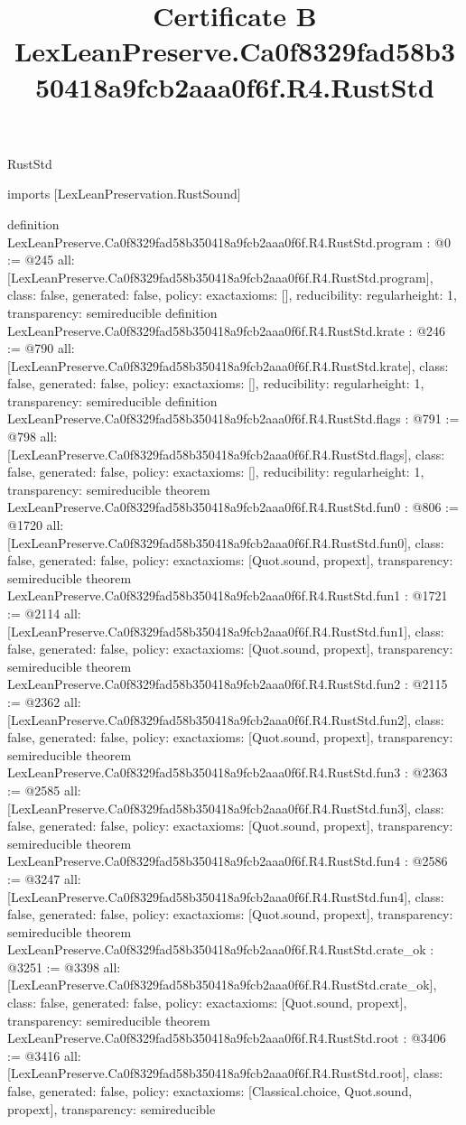 \begin{lexlean}{RustStd}
\title{Certificate B LexLeanPreserve.Ca0f8329fad58b350418a9fcb2aaa0f6f.R4.RustStd}
\begin{coremodule}
imports [LexLeanPreservation.RustSound]

definition LexLeanPreserve.Ca0f8329fad58b350418a9fcb2aaa0f6f.R4.RustStd.program : @0 := @245 {
  all: [LexLeanPreserve.Ca0f8329fad58b350418a9fcb2aaa0f6f.R4.RustStd.program],
  class: false,
  generated: false,
  policy: exact{axioms: []},
  reducibility: regular{height: 1},
  transparency: semireducible
}
definition LexLeanPreserve.Ca0f8329fad58b350418a9fcb2aaa0f6f.R4.RustStd.krate : @246 := @790 {
  all: [LexLeanPreserve.Ca0f8329fad58b350418a9fcb2aaa0f6f.R4.RustStd.krate],
  class: false,
  generated: false,
  policy: exact{axioms: []},
  reducibility: regular{height: 1},
  transparency: semireducible
}
definition LexLeanPreserve.Ca0f8329fad58b350418a9fcb2aaa0f6f.R4.RustStd.flags : @791 := @798 {
  all: [LexLeanPreserve.Ca0f8329fad58b350418a9fcb2aaa0f6f.R4.RustStd.flags],
  class: false,
  generated: false,
  policy: exact{axioms: []},
  reducibility: regular{height: 1},
  transparency: semireducible
}
theorem LexLeanPreserve.Ca0f8329fad58b350418a9fcb2aaa0f6f.R4.RustStd.fun0 : @806 := @1720 {
  all: [LexLeanPreserve.Ca0f8329fad58b350418a9fcb2aaa0f6f.R4.RustStd.fun0],
  class: false,
  generated: false,
  policy: exact{axioms: [Quot.sound, propext]},
  transparency: semireducible
}
theorem LexLeanPreserve.Ca0f8329fad58b350418a9fcb2aaa0f6f.R4.RustStd.fun1 : @1721 := @2114 {
  all: [LexLeanPreserve.Ca0f8329fad58b350418a9fcb2aaa0f6f.R4.RustStd.fun1],
  class: false,
  generated: false,
  policy: exact{axioms: [Quot.sound, propext]},
  transparency: semireducible
}
theorem LexLeanPreserve.Ca0f8329fad58b350418a9fcb2aaa0f6f.R4.RustStd.fun2 : @2115 := @2362 {
  all: [LexLeanPreserve.Ca0f8329fad58b350418a9fcb2aaa0f6f.R4.RustStd.fun2],
  class: false,
  generated: false,
  policy: exact{axioms: [Quot.sound, propext]},
  transparency: semireducible
}
theorem LexLeanPreserve.Ca0f8329fad58b350418a9fcb2aaa0f6f.R4.RustStd.fun3 : @2363 := @2585 {
  all: [LexLeanPreserve.Ca0f8329fad58b350418a9fcb2aaa0f6f.R4.RustStd.fun3],
  class: false,
  generated: false,
  policy: exact{axioms: [Quot.sound, propext]},
  transparency: semireducible
}
theorem LexLeanPreserve.Ca0f8329fad58b350418a9fcb2aaa0f6f.R4.RustStd.fun4 : @2586 := @3247 {
  all: [LexLeanPreserve.Ca0f8329fad58b350418a9fcb2aaa0f6f.R4.RustStd.fun4],
  class: false,
  generated: false,
  policy: exact{axioms: [Quot.sound, propext]},
  transparency: semireducible
}
theorem LexLeanPreserve.Ca0f8329fad58b350418a9fcb2aaa0f6f.R4.RustStd.crate_ok : @3251 := @3398 {
  all: [LexLeanPreserve.Ca0f8329fad58b350418a9fcb2aaa0f6f.R4.RustStd.crate_ok],
  class: false,
  generated: false,
  policy: exact{axioms: [Quot.sound, propext]},
  transparency: semireducible
}
theorem LexLeanPreserve.Ca0f8329fad58b350418a9fcb2aaa0f6f.R4.RustStd.root : @3406 := @3416 {
  all: [LexLeanPreserve.Ca0f8329fad58b350418a9fcb2aaa0f6f.R4.RustStd.root],
  class: false,
  generated: false,
  policy: exact{axioms: [Classical.choice, Quot.sound, propext]},
  transparency: semireducible
}


\end{coremodule}
\end{lexlean}
